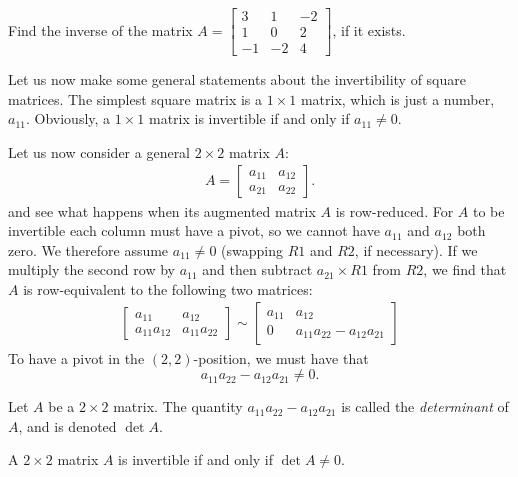 \documentclass[12pt,letterpaper,reqno]{article}
\numberwithin{equation}{section}
\newcommand{\ti}[1]{\textit{#1}}
\begin{document}
\begin{exercise}
Find the inverse of the matrix $A=\begin{bmatrix}
	3 & 1 & -2 \\ 1 & 0 & 2 \\ -1 & -2 & 4
\end{bmatrix}$, if it exists.	
\end{exercise}

Let us now make some general statements about the invertibility of square matrices. The simplest square matrix is a $1 \times 1$ matrix, which is just a number, $a_{11}$. Obviously, a $1 \times 1$ matrix is invertible if and only if $a_{11} \neq 0$.

Let us now consider a general $2 \times 2$ matrix $A$:
\begin{align*}
	A=\begin{bmatrix}
		a_{11} & a_{12} \\ a_{21} & a_{22}
	\end{bmatrix}.
\end{align*}
and see what happens when its augmented matrix $A$ is row-reduced. For $A$ to be invertible each column must have a pivot, so we cannot have $a_{11}$ and $a_{12}$ both zero. We therefore assume $a_{11} \neq 0$ (swapping $R1$ and $R2$, if necessary). If we multiply the second row by $a_{11}$ and then subtract $a_{21} \times R1$ from $R2$, we find that $A$ is row-equivalent to the following two matrices:
\begin{align*}
	\begin{bmatrix}
		a_{11}& a_{12} \\ a_{11}a_{12} & a_{11}a_{22}
	\end{bmatrix} \sim \begin{bmatrix}
		a_{11}& a_{12} \\ 
		0 & a_{11}a_{22}-a_{12}a_{21}
	\end{bmatrix}
\end{align*} 
To have a pivot in the $(2,2)$-position, we must have that
\begin{equation}
	a_{11}a_{22}-a_{12}a_{21} \neq 0.
\end{equation}

\begin{defn}
Let $A$ be a $2 \times 2$ matrix. The quantity $a_{11}a_{22}-a_{12}a_{21}$ is called the \ti{determinant} of $A$, and is denoted $\det A$.
\end{defn}

\begin{prop}\label{prop:2_by_2_invertibility}
A $2 \times 2$ matrix $A$ is invertible if and only if $\det A \neq 0$.
\end{prop}
\end{document}
